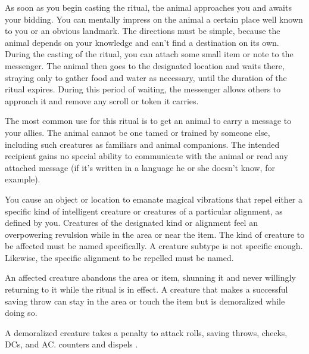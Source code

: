 \spellrng{\rngclose}
\begin{spelleffect}
As soon as you begin casting the ritual, the animal approaches you and awaits your bidding. You can mentally impress on the animal a certain place well known to you or an obvious landmark. The directions must be simple, because the animal depends on your knowledge and can't find a destination on its own. During the casting of the ritual, you can attach some small item or note to the messenger. The animal then goes to the designated location and waits there, straying only to gather food and water as necessary, until the duration of the ritual expires. During this period of waiting, the messenger allows others to approach it and remove any scroll or token it carries.
\end{spelleffect}
\begin{spellnotes}
The most common use for this ritual is to get an animal to carry a message to your allies. The animal cannot be one tamed or trained by someone else, including such creatures as familiars and animal companions. The intended recipient gains no special ability to communicate with the animal or read any attached message (if it's written in a language he or she doesn't know, for example).
\end{spellnotes}

\spellrng{\rngclose}
\begin{spelleffect}
You cause an object or location to emanate magical vibrations that repel either a specific kind of intelligent creature or creatures of a particular alignment, as defined by you. Creatures of the designated kind or alignment feel an overpowering revulsion while in the area or near the item. The kind of creature to be affected must be named specifically. A creature subtype is not specific enough. Likewise, the specific alignment to be repelled must be named.
\par An affected creature abandons the area or item, shunning it and never willingly returning to it while the ritual is in effect. A creature that makes a successful saving throw can stay in the area or touch the item but is demoralized while doing so.
\end{spelleffect}
\begin{spellnotes}
A demoralized creature takes a  penalty to attack rolls, saving throws, checks, DCs, and AC.  counters and dispels .
\end{spellnotes}


